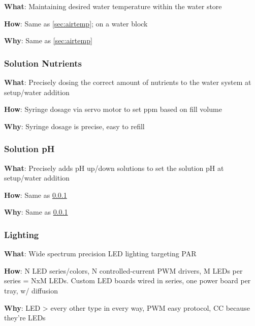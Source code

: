 \documentclass{report}
\begin{document}
\textbf{What}: Maintaining desired water temperature within the water store

\textbf{How}: Same as \ref{sec:airtemp}; on a water block

\textbf{Why}: Same as \ref{sec:airtemp}

\newpage

\subsubsection{Solution Nutrients}
\label{sec:nutrients}

\textbf{What}: Precisely dosing the correct amount of nutrients to the water system at setup/water addition

\textbf{How}: Syringe dosage via servo motor to set ppm based on fill volume

\textbf{Why}: Syringe dosage is precise, easy to refill

\subsubsection{Solution pH}
\label{sec:ph}

\textbf{What}: Precisely adds pH up/down solutions to set the solution pH at setup/water addition

\textbf{How}: Same as \ref{sec:nutrients}

\textbf{Why}: Same as \ref{sec:nutrients}

\subsubsection{Lighting}
\label{sec:lighting}

\textbf{What}: Wide spectrum precision LED lighting targeting PAR

\textbf{How}: N LED series/colors, N controlled-current PWM drivers, M LEDs per series = NxM LEDs. Custom LED boards wired in series, one power board per tray, w/ diffusion

\textbf{Why}: LED > every other type in every way, PWM easy protocol, CC because they’re LEDs




% 
% 
\end{document}
